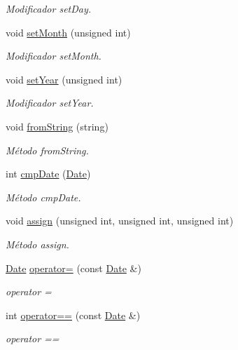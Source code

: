 \begin{DoxyCompactItemize}
\begin{DoxyCompactList}\small\item\em Modificador set\+Day. \end{DoxyCompactList}\item 
void \hyperlink{class_date_aae2c1d1158d2760ba4d5a23c528fd24d}{set\+Month} (unsigned int)\hypertarget{class_date_aae2c1d1158d2760ba4d5a23c528fd24d}{}\label{class_date_aae2c1d1158d2760ba4d5a23c528fd24d}

\begin{DoxyCompactList}\small\item\em Modificador set\+Month. \end{DoxyCompactList}\item 
void \hyperlink{class_date_abf7cafce8365f4ad601c270bb3f0f02d}{set\+Year} (unsigned int)\hypertarget{class_date_abf7cafce8365f4ad601c270bb3f0f02d}{}\label{class_date_abf7cafce8365f4ad601c270bb3f0f02d}

\begin{DoxyCompactList}\small\item\em Modificador set\+Year. \end{DoxyCompactList}\item 
void \hyperlink{class_date_a4ca1e1caba11928c842f6c62a2c851ab}{from\+String} (string)\hypertarget{class_date_a4ca1e1caba11928c842f6c62a2c851ab}{}\label{class_date_a4ca1e1caba11928c842f6c62a2c851ab}

\begin{DoxyCompactList}\small\item\em Método from\+String. \end{DoxyCompactList}\item 
int \hyperlink{class_date_ae8b8f304223099e3ecf37e64232c757a}{cmp\+Date} (\hyperlink{class_date}{Date})
\begin{DoxyCompactList}\small\item\em Método cmp\+Date. \end{DoxyCompactList}\item 
void \hyperlink{class_date_a2ad9e0b62b3abea9c9d471373ce5fdef}{assign} (unsigned int, unsigned int, unsigned int)\hypertarget{class_date_a2ad9e0b62b3abea9c9d471373ce5fdef}{}\label{class_date_a2ad9e0b62b3abea9c9d471373ce5fdef}

\begin{DoxyCompactList}\small\item\em Método assign. \end{DoxyCompactList}\item 
\hyperlink{class_date}{Date} \hyperlink{class_date_a449df9445b4f4fac127e171ac981adb3}{operator=} (const \hyperlink{class_date}{Date} \&)
\begin{DoxyCompactList}\small\item\em operator = \end{DoxyCompactList}\item 
int \hyperlink{class_date_aea7500eb1bee5e573c01c32458bbe83e}{operator==} (const \hyperlink{class_date}{Date} \&)
\begin{DoxyCompactList}\small\item\em operator == \end{DoxyCompactList}\end{DoxyCompactItemize}


